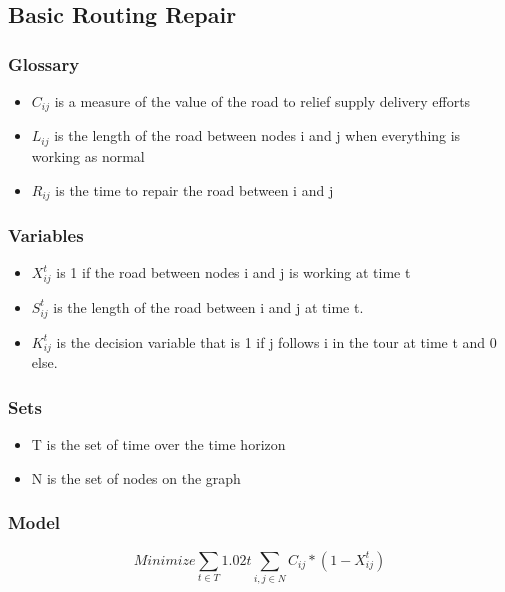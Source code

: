 \documentclass{article}
\begin{document}
	\subsection{Basic Routing Repair}
	\subsubsection{Glossary}
	\begin{itemize}
		\item $C_{ij}$ is a measure of the value of the road to relief supply delivery efforts
		\item $L_{ij}$ is the length of the road between nodes i and j when everything is working as normal
		\item $R_{ij}$ is the time to repair the road between i and j
	\end{itemize}
	\subsubsection{Variables}
	\begin{itemize}
		\item $X_{ij}^t$ is 1 if the road between nodes i and j is working at time t
		\item $S_{ij}^t$ is the length of the road between i and j at time t. 
		\item $K_{ij}^t$ is the decision variable that is 1 if j follows i in the tour at time t and 0 else.
		
	\end{itemize}
	\subsubsection{Sets}
	\begin{itemize}
		\item T is the set of time over the time horizon
		\item N is the set of nodes on the graph
	\end{itemize}
	\subsubsection{Model}
	$$	Minimize \sum_{t \in T} 1.02t \sum_{i,j \in N} C_{ij}*(1-X_{ij}^t) $$
	
\end{document}
